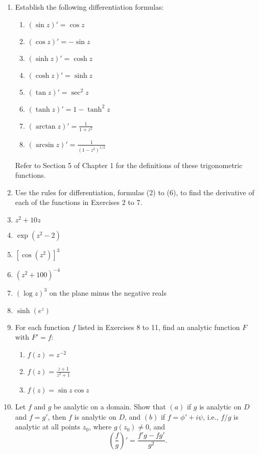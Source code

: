 \documentclass[12pt]{article}
\theoremstyle{definition} %
\theoremstyle{plain} %
\begin{document}
\begin{enumerate}
    \item Establish the following differentiation formulas:
    \begin{enumerate}
        \item $(\sin z)' = \cos z$
        \item $(\cos z)' = -\sin z$
        \item $(\sinh z)' = \cosh z$
        \item $(\cosh z)' = \sinh z$
        \item $(\tan z)' = \sec^2 z$
        \item $(\tanh z)' = 1 - \tanh^2 z$
        \item $(\arctan z)' = \frac{1}{1 + z^2}$
        \item $(\arcsin z)' = \frac{1}{(1 - z^2)^{1/2}}$
    \end{enumerate}
    Refer to Section 5 of Chapter 1 for the definitions of these trigonometric functions.
    
    \item Use the rules for differentiation, formulas (2) to (6), to find the derivative of each of the functions in Exercises 2 to 7.
    
    \item $z^2 + 10z$
    
    \item $\exp(z^2 - 2)$
    
    \item $[\cos(z^2)]^3$
    
    \item $(z^2 + 100)^{-4}$
    
    \item $(\log z)^3$ on the plane minus the negative reals
    
    \item $\sinh(e^z)$
    
    \item For each function $f$ listed in Exercises 8 to 11, find an analytic function $F$ with $F' = f$:
    \begin{enumerate}
        \item $f(z) = z^{-2}$
        \item $f(z) = \frac{z + 1}{z^2 + 1}$
        \item $f(z) = \sin z \cos z$
    \end{enumerate}
    
    \item Let $f$ and $g$ be analytic on a domain. Show that $(a)$ if $g$ is analytic on $D$ and $f = g'$, then $f$ is analytic on $D$, and $(b)$ if $f = \phi' + i\psi$, i.e., $f/g$ is analytic at all points $z_0$, where $g(z_0) \ne 0$, and
    \[
    \left( \frac{f}{g} \right)' = \frac{f'g - fg'}{g^2}.
    \]
    

\end{enumerate}
\end{document}
